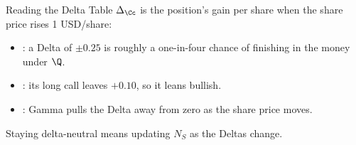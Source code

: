 \begin{frame}{Reading the Delta Table}
  $\Delta_{\Cc}$ is the position's gain per share when the share price rises 1
  USD/share:
  \begin{itemize}\setlength{\itemsep}{0.5em}
    \item {}: a Delta of $\pm0.25$ is roughly a
      one-in-four chance of finishing in the money under $\Q$.
    \item {}: its long call leaves $+0.10$, so it
      leans bullish.
    \item {}: Gamma pulls the Delta away from zero as
      the share price moves.
  \end{itemize}
  \vspace{0.4em}
  Staying delta-neutral means updating $N_{S}$ as the Deltas change.
\end{frame}

